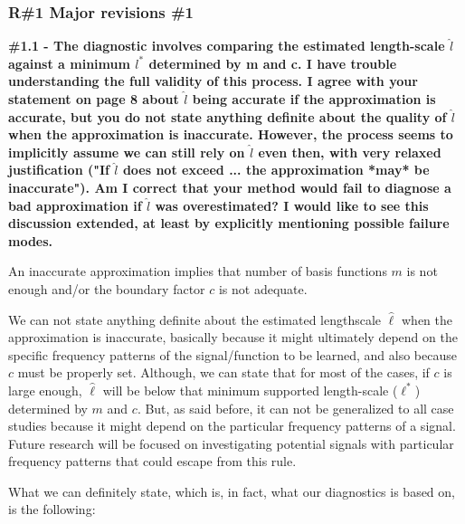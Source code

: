 \documentclass[11pt]{report}
\begin{document}

\subsubsection*{R\#1 Major revisions \#1}

\textbf{\#1.1 - The diagnostic involves comparing the estimated length-scale $\hat l$ against a minimum $l^*$ determined by m and c. I have trouble understanding the full validity of this process. I agree with your statement on page 8 about $\hat l$ being accurate if the approximation is accurate, but you do not state anything definite about the quality of $\hat l$ when the approximation is inaccurate. However, the process seems to implicitly assume we can still rely on $\hat l$ even then, with very relaxed justification ("If $\hat l$ does not exceed ... the approximation *may* be inaccurate"). Am I correct that your method would fail to diagnose a bad approximation if $\hat l$ was overestimated? I would like to see this discussion extended, at least by explicitly mentioning possible failure modes.}

An inaccurate approximation implies that number of basis functions $m$ is not enough and/or the boundary factor $c$ is not adequate.

We can not state anything definite about the estimated lengthscale $\hat{\ell}$ when the approximation is inaccurate, basically because it might ultimately depend on the specific frequency patterns of the signal/function to be learned, and also because $c$ must be properly set. Although, we can state that for most of the cases, if $c$ is large enough, $\hat{\ell}$ will be below that minimum supported length-scale ($\ell^*$) determined by $m$ and $c$. But, as said before, it can not be generalized to all case studies because it might depend on the particular frequency patterns of a signal. Future research will be focused on investigating potential signals with particular frequency patterns that could escape from this rule.

What we can definitely state, which is, in fact, what our diagnostics is based on, is the following:
\end{document}
